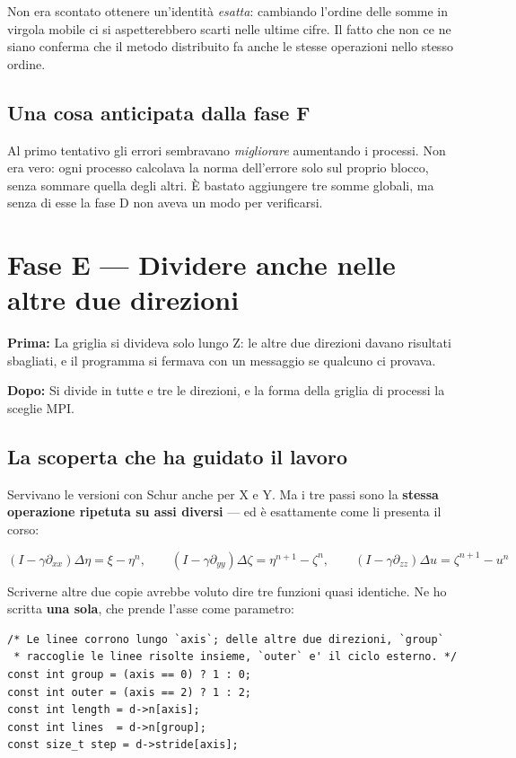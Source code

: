 \documentclass[11pt,a4paper]{article}
\newcommand{\prima}[1]{\par\smallskip\noindent\textbf{\color{scuro}Prima:} #1\par}
\newcommand{\dopo}[1]{\par\smallskip\noindent\textbf{\color{scuro}Dopo:} #1\par\smallskip}
\begin{document}
\medskip
Non era scontato ottenere un'identità \emph{esatta}: cambiando l'ordine delle
somme in virgola mobile ci si aspetterebbero scarti nelle ultime cifre. Il
fatto che non ce ne siano conferma che il metodo distribuito fa anche le stesse
operazioni nello stesso ordine.

\subsection*{Una cosa anticipata dalla fase F}

Al primo tentativo gli errori sembravano \emph{migliorare} aumentando i
processi. Non era vero: ogni processo calcolava la norma dell'errore solo sul
proprio blocco, senza sommare quella degli altri. È bastato aggiungere tre
somme globali, ma senza di esse la fase D non aveva un modo per verificarsi.

\section{Fase E --- Dividere anche nelle altre due direzioni}

\prima{La griglia si divideva solo lungo Z: le altre due direzioni davano
risultati sbagliati, e il programma si fermava con un messaggio se qualcuno ci
provava.}

\dopo{Si divide in tutte e tre le direzioni, e la forma della griglia di
processi la sceglie MPI.}

\subsection*{La scoperta che ha guidato il lavoro}

Servivano le versioni con Schur anche per X e Y. Ma i tre passi sono la
\textbf{stessa operazione ripetuta su assi diversi} --- ed è esattamente come
li presenta il corso:

$$(I-\gamma\partial_{xx})\Delta\eta = \xi-\eta^n, \qquad
  (I-\gamma\partial_{yy})\Delta\zeta = \eta^{n+1}-\zeta^n, \qquad
  (I-\gamma\partial_{zz})\Delta u = \zeta^{n+1}-u^n$$

Scriverne altre due copie avrebbe voluto dire tre funzioni quasi identiche. Ne
ho scritta \textbf{una sola}, che prende l'asse come parametro:

\begin{lstlisting}
/* Le linee corrono lungo `axis`; delle altre due direzioni, `group`
 * raccoglie le linee risolte insieme, `outer` e' il ciclo esterno. */
const int group = (axis == 0) ? 1 : 0;
const int outer = (axis == 2) ? 1 : 2;
const int length = d->n[axis];
const int lines  = d->n[group];
const size_t step = d->stride[axis];
\end{lstlisting}
\end{document}
